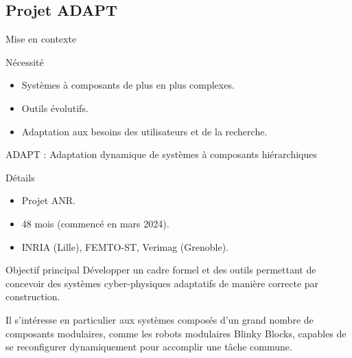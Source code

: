 \subsection{Projet ADAPT}

\begin{frame}{Mise en contexte}
    \begin{block}{Nécessité}
        \begin{itemize}
            \item Systèmes à composants de plus en plus complexes.
            \item Outils évolutifs.
            \item Adaptation aux besoins des utilisateurs et de la recherche.
        \end{itemize}
    \end{block}
\end{frame}

\begin{frame}{ADAPT : Adaptation dynamique de systèmes à composants hiérarchiques}

\vspace{5mm}

\begin{block}{Détails}
\begin{itemize}
    \item Projet ANR.
    \item 48 mois (commencé en mars 2024).
    \item INRIA (Lille), FEMTO-ST, Verimag (Grenoble).
\end{itemize}
\end{block}

\begin{block}{Objectif principal}
    Développer un cadre formel et des outils permettant de concevoir des systèmes cyber-physiques adaptatifs de manière correcte par construction.
\end{block}

\begin{block}{}
    Il s'intéresse en particulier aux systèmes composés d'un grand nombre de composants modulaires, comme les robots modulaires Blinky Blocks, capables de se reconfigurer dynamiquement pour accomplir une tâche commune.
\end{block}
    
\end{frame}

